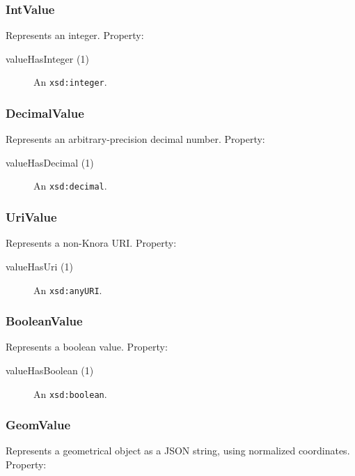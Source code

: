 \documentclass[12pt, a4paper]{article}
\begin{document}
\subsubsection{IntValue}

Represents an integer. Property:

\begin{description}
	\item[valueHasInteger (1)] An \texttt{xsd:integer}.
\end{description}

\subsubsection{DecimalValue}

Represents an arbitrary-precision decimal number. Property:

\begin{description}
	\item[valueHasDecimal (1)] An \texttt{xsd:decimal}.
\end{description}

\subsubsection{UriValue}

Represents a non-Knora URI. Property:

\begin{description}
	\item[valueHasUri (1)] An \texttt{xsd:anyURI}.
\end{description}

\subsubsection{BooleanValue}

Represents a boolean value. Property:

\begin{description}
	\item[valueHasBoolean (1)] An \texttt{xsd:boolean}.
\end{description}

\subsubsection{GeomValue}

Represents a geometrical object as a JSON string, using normalized coordinates. Property:
\end{document}
